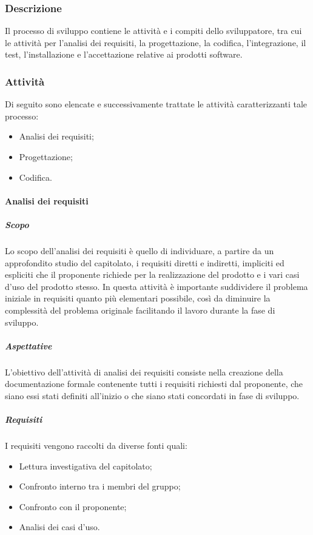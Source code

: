     \subsubsection{Descrizione} \label{subsubsection:Sviluppo_Descrizione}
    Il processo di sviluppo contiene le attività e i compiti dello sviluppatore, tra cui le attività per l’analisi dei requisiti, la progettazione, 
    la codifica, l’integrazione, il test, l’installazione e l’accettazione relative ai prodotti software.

    \subsubsection{Attività} \label{subsubsection:Attivita'}
    Di seguito sono elencate e successivamente trattate le attività caratterizzanti tale processo:
    \begin{itemize}
        \item Analisi dei requisiti;
        \item Progettazione;
        \item Codifica.
    \end{itemize}
    
        \paragraph{Analisi dei requisiti} \label{paragraph:Analisi dei requisiti}
            \subparagraph{Scopo}
            Lo scopo dell’analisi dei requisiti è quello di individuare, a partire da un approfondito studio del capitolato, i requisiti diretti e indiretti,
            impliciti ed espliciti che il proponente richiede per la realizzazione del prodotto e i vari casi d'uso del prodotto stesso. In questa attività è importante
            suddividere il problema iniziale in requisiti quanto più elementari possibile, così da diminuire la complessità del problema originale
             facilitando il lavoro durante la fase di sviluppo.

            \subparagraph{Aspettative} \label{subparagraph:ADR_Aspettative}
            L’obiettivo dell’attività di analisi dei requisiti consiste nella creazione della documentazione formale contenente tutti i requisiti 
            richiesti dal proponente, che siano essi stati definiti all'inizio o che siano stati concordati in fase di sviluppo.

            \subparagraph{Requisiti} \label{subparagraph:Requisiti}
            I requisiti vengono raccolti da diverse fonti quali:
            \begin{itemize}
               \item Lettura investigativa del capitolato;
                \item Confronto interno tra i membri del gruppo;
                \item Confronto con il proponente;
                \item Analisi dei casi d'uso.
            \end{itemize}

